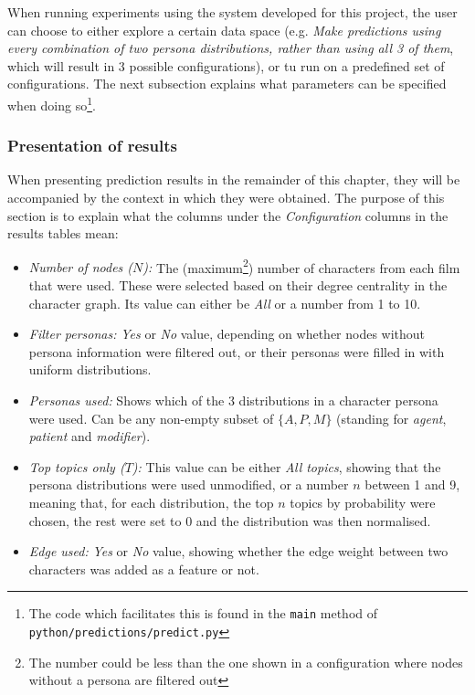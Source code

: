 \documentclass[bsc,frontabs,singlespacing,parskip, twoside]{infthesis}
\begin{document}
When running experiments using the system developed for this project, the user can choose to either explore a certain data space (e.g. \textit{Make predictions using every combination of two persona distributions, rather than using all 3 of them}, which will result in 3 possible configurations), or tu run on a predefined set of configurations. The next subsection explains what parameters can be specified when doing so\footnote{The code which facilitates this is found in the \texttt{main} method of \texttt{python/predictions/predict.py}}. 

\subsubsection{Presentation of results}
When presenting prediction results in the remainder of this chapter, they will be accompanied by the context in which they were obtained. The purpose of this section is to explain what the columns under the \textit{Configuration} columns in the results tables mean:
\begin{itemize}
	\item \textit{Number of nodes ($N$):} The (maximum\footnote{The number could be less than the one shown in a configuration where nodes without a persona are filtered out}) number of characters from each film that were used. These were selected based on their degree centrality in the character graph. Its value can either be \textit{All} or a number from 1 to 10.
	\item \textit{Filter personas:} \textit{Yes} or \textit{No} value, depending on whether nodes without persona information were filtered out, or their personas were filled in with uniform distributions.
	\item \textit{Personas used:} Shows which of the 3 distributions in a character persona were used. Can be any non-empty subset of $\{A, P, M\}$ (standing for \textit{agent}, \textit{patient} and \textit{modifier}).
	\item \textit{Top topics only ($T$):} This value can be either \textit{All topics}, showing that the persona distributions were used unmodified, or a number $n$ between 1 and 9, meaning that, for each distribution, the top $n$ topics by probability were chosen, the rest were set to 0 and the distribution was then normalised.
	\item \textit{Edge used:} \textit{Yes} or \textit{No} value, showing whether the edge weight between two characters was added as a feature or not.
\end{itemize}
\end{document}
